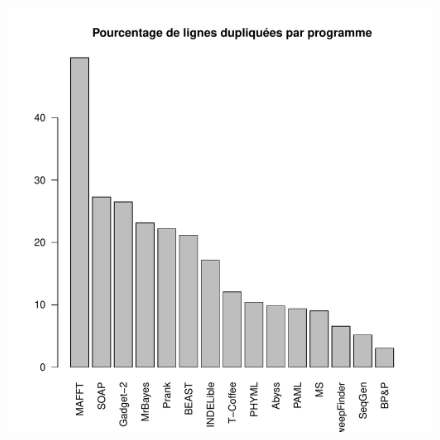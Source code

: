 \begin{figure}[h]
  \includegraphics[width=\linewidth]{figures/pdlin_prog.pdf}
  \caption{}\label{fig:pdlin_prog}
  \endminipage\hfill
\end{figure}
